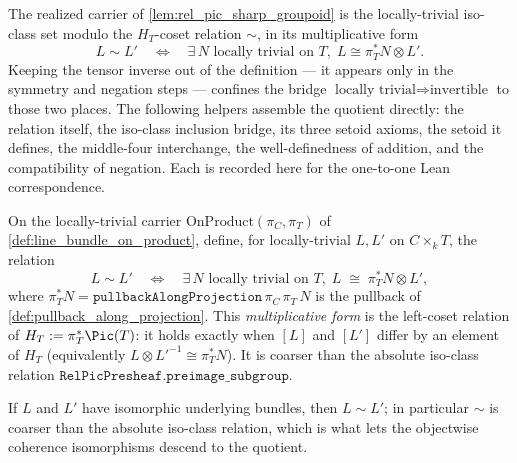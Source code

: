 The realized carrier of \cref{lem:rel_pic_sharp_groupoid} is the
locally-trivial iso-class set modulo the \(H_T\)-coset relation \(\sim\), in
its multiplicative form
\[
  L \sim L' \quad\Longleftrightarrow\quad
    \exists\, N \text{ locally trivial on } T,\;
    L \cong \pi_T^* N \otimes L' .
\]
Keeping the tensor inverse out of the definition --- it appears only in the
symmetry and negation steps --- confines the bridge
\(\text{locally trivial} \Rightarrow \text{invertible}\) to those two
places. The following helpers assemble the quotient directly: the relation
itself, the iso-class inclusion bridge, its three setoid axioms, the setoid it
defines, the middle-four interchange, the well-definedness of addition, and
the compatibility of negation. Each is recorded here for the one-to-one Lean
correspondence.

\begin{definition}\leanok
  \label{lem:relpic_rel}
  On the locally-trivial carrier \(\mathrm{OnProduct}(\pi_C, \pi_T)\) of
  \cref{def:line_bundle_on_product}, define, for locally-trivial \(L, L'\) on
  \(C \times_k T\), the relation
  \[
    L \sim L' \quad\Longleftrightarrow\quad
      \exists\, N \text{ locally trivial on } T,\;
      L \;\cong\; \pi_T^* N \otimes L' ,
  \]
  where \(\pi_T^* N = \mathtt{pullbackAlongProjection}\,\pi_C\,\pi_T\,N\) is the
  pullback of \cref{def:pullback_along_projection}. This \emph{multiplicative
  form} is the left-coset relation of \(H_T := \pi_T^*\Pic(T)\): it holds exactly
  when \([L]\) and \([L']\) differ by an element of \(H_T\) (equivalently
  \(L \otimes L'^{-1} \cong \pi_T^* N\)). It is coarser than the absolute
  iso-class relation \(\mathtt{RelPicPresheaf.preimage\_subgroup}\).
\end{definition}

\begin{lemma}\leanok
  \label{lem:relpic_rel_of_iso}
  If \(L\) and \(L'\) have isomorphic underlying bundles, then \(L \sim L'\); in
  particular \(\sim\) is coarser than the absolute iso-class relation, which is
  what lets the objectwise coherence isomorphisms descend to the quotient.
\end{lemma}

